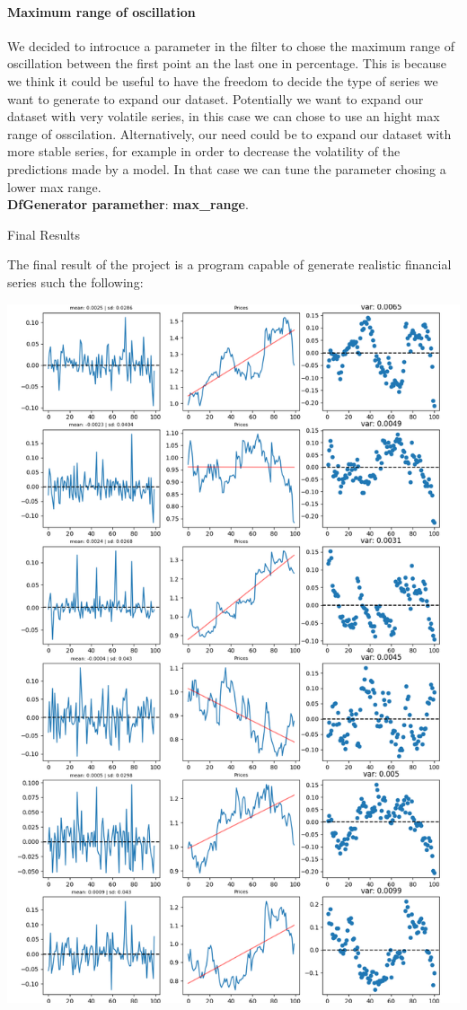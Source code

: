 \documentclass{article}
\begin{document}
\begin{multicols}{2}
    \paragraph*{Maximum range of oscillation}
    We decided to introcuce a parameter in the filter to chose the maximum range of oscillation between the first point an the last one in percentage. This is because we think it could be useful to have the freedom to decide the type of series we want 
    to generate to expand our dataset. Potentially we want to expand our dataset with very volatile series, in this case we can chose to use an hight max range of osscilation. Alternatively, our need could be to expand our dataset with more stable series, for example in order to decrease 
    the volatility of the predictions made by a model. In that case we can tune the parameter chosing a lower max range.\\
    \textbf{DfGenerator paramether}:  \textbf{max\_range}.

    \end{multicols}
    \newpage
    \begin{center}
        {\huge{Final Results}}
    \end{center} 
    The final result of the project is a program capable of generate realistic financial series such the following:
    \begin{center}
        \includegraphics[scale=0.5]{imgs/results_reduced.png}
    \end{center}
\end{document}
